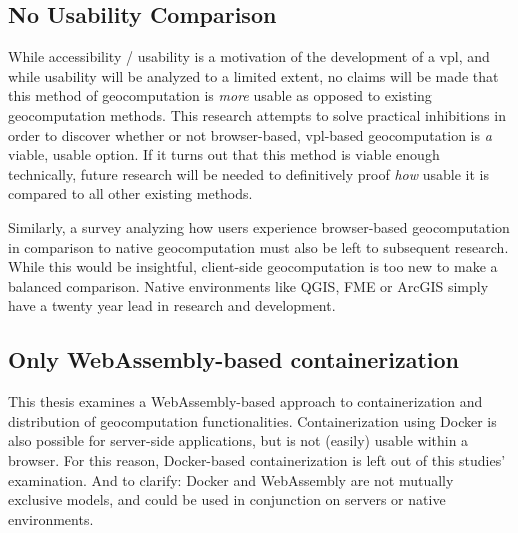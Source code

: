 \subsection*{No Usability Comparison} %
While accessibility / usability is a motivation of the development of a \ac{vpl}, and while usability will be analyzed to a limited extent, no claims will be made that this method of geocomputation is \emph{more} usable as opposed to existing geocomputation methods. This research attempts to solve practical inhibitions in order to discover whether or not browser-based, vpl-based geocomputation is \emph{a} viable, usable option. If it turns out that this method is viable enough technically, future research will be needed to definitively proof \emph{how} usable it is compared to all other existing methods.  


Similarly, a survey analyzing how users experience browser-based geocomputation in comparison to native geocomputation must also be left to subsequent research. While this would be insightful, client-side geocomputation is too new to make a balanced comparison. Native environments like QGIS, FME or ArcGIS simply have a twenty year lead in research and development. 




\subsection*{Only WebAssembly-based containerization}
This thesis examines a WebAssembly-based approach to containerization and distribution of geocomputation functionalities. 
Containerization using Docker is also possible for server-side applications, but is not (easily) usable within a browser. 
For this reason, Docker-based containerization is left out of this studies' examination. 
And to clarify: Docker and WebAssembly are not mutually exclusive models, and could be used in conjunction on servers or native environments. 

